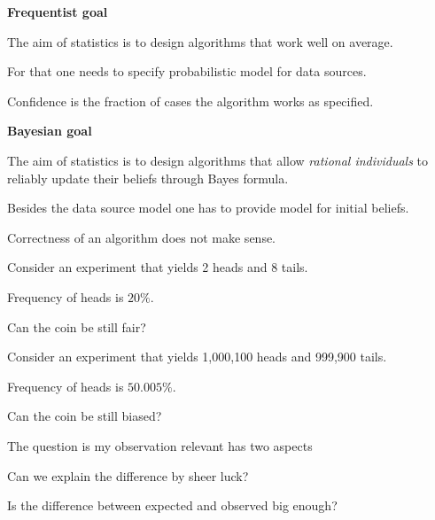 \documentclass[landscape,footrule]{foils}
\begin{document}

\textbf{Frequentist goal}
\begin{triangles}
\item The aim of statistics is to design algorithms that work well on average.
\item For that one needs to specify probabilistic model for data sources.
\item Confidence is the fraction of cases the algorithm works as specified.
\end{triangles}
\vspace*{2cm}

\textbf{Bayesian goal}
\begin{triangles}
\item The aim of statistics is to design algorithms that allow \emph{rational individuals} to reliably update their beliefs through Bayes formula.
\item Besides the data source model one has to provide model for initial beliefs.
\item Correctness of an algorithm does not make sense.
\end{triangles}



Consider an experiment that yields 2 heads and 8 tails.
\begin{triangles}
\item Frequency of heads is $20\%$.
\item Can the coin be still fair?
\end{triangles}
\vspace*{1cm}
 
Consider an experiment that yields 1,000,100 heads and 999,900 tails.
\begin{triangles}
\item Frequency of heads is $50.005\%$.
\item Can the coin be still biased?
\end{triangles}



\vspace*{1ex}
\vspace*{-2ex}
The question is my observation relevant has two aspects
\begin{triangles}
\item Can we explain the difference by sheer luck? 
\item Is the difference between expected and observed big enough?
\end{triangles}
\end{document}
